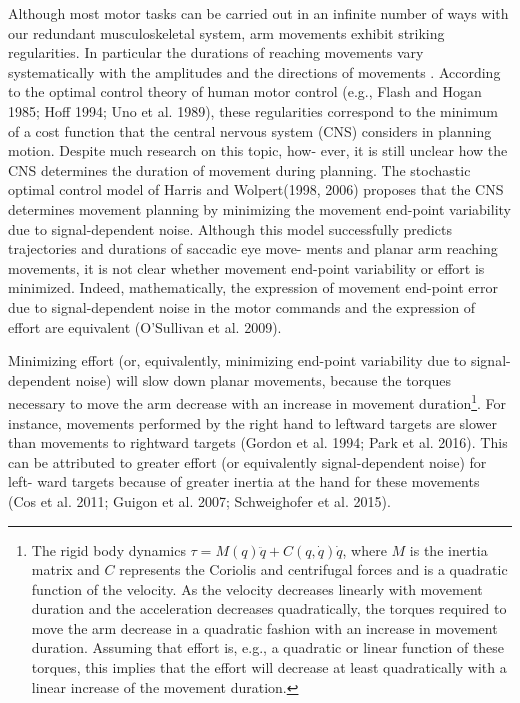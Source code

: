 Although most motor tasks can be carried out in an infinite number of ways with our redundant musculoskeletal system, arm movements exhibit striking regularities. In particular the durations of reaching movements vary systematically with the amplitudes and the directions of movements \cite{Gordon1994}. According to the optimal control theory of human motor control (e.g., Flash and Hogan 1985; Hoff 1994; Uno et al. 1989), these regularities correspond to the minimum of a cost function that the central nervous system (CNS) considers in planning motion. Despite much research on this topic, how- ever, it is still unclear how the CNS determines the duration of movement during planning. The stochastic optimal control model of Harris and Wolpert(1998, 2006) proposes that the CNS determines movement planning by minimizing the movement end-point variability due to signal-dependent noise. Although this model successfully predicts trajectories and durations of saccadic eye move- ments and planar arm reaching movements, it is not clear whether movement end-point variability or effort is minimized. Indeed, mathematically, the expression of movement end-point error due to signal-dependent noise in the motor commands and the expression of effort are equivalent (O’Sullivan et al. 2009).

Minimizing effort (or, equivalently, minimizing end-point variability due to signal-dependent noise) will slow down planar movements, because the torques necessary to move the arm decrease with an increase in movement duration\footnote{The rigid body dynamics $\tau = M(q)\ddot{q} + C(q,\dot{q})\dot{q}$, where $M$ is the inertia matrix and $C$ represents the Coriolis and centrifugal forces and is a quadratic function of the velocity. As the velocity decreases linearly with movement duration and the acceleration decreases quadratically, the torques required to move the arm decrease in a quadratic fashion with an increase in movement duration. Assuming that effort is, e.g., a quadratic or linear function of these torques, this implies that the effort will decrease at least quadratically with a linear increase of the movement duration.}. For instance, movements performed by the right hand to leftward targets are slower than movements to rightward targets (Gordon et al. 1994; Park et al. 2016). This can be attributed to greater effort (or equivalently signal-dependent noise) for left- ward targets because of greater inertia at the hand for these movements (Cos et al. 2011; Guigon et al. 2007; Schweighofer et al. 2015). 

